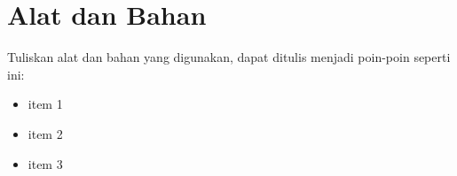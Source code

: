 \chapter{Alat dan Bahan}

Tuliskan alat dan bahan yang digunakan, dapat ditulis menjadi poin-poin seperti ini:
\begin{itemize}[noitemsep]
    \item item 1
    \item item 2
    \item item 3
\end{itemize}